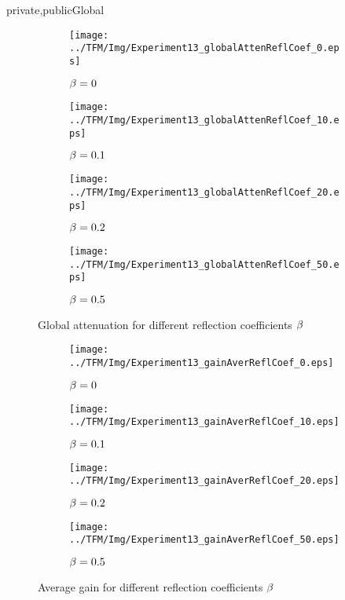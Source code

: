 \begin{shownto}{private,publicGlobal}
\begin{figure}[h]
	\centering
	\begin{subfigure}[b]{0.45\textwidth}
		\centering
		\texttt{[image: ../TFM/Img/Experiment13\_globalAttenReflCoef\_0.eps]}
		\caption{$\beta = 0$}
	\end{subfigure}
	\begin{subfigure}[b]{0.45\textwidth}
		\centering
		\texttt{[image: ../TFM/Img/Experiment13\_globalAttenReflCoef\_10.eps]}
		\caption{$\beta = 0.1$}
	\end{subfigure}
	\begin{subfigure}[b]{0.45\textwidth}
		\centering
		\texttt{[image: ../TFM/Img/Experiment13\_globalAttenReflCoef\_20.eps]}
		\caption{$\beta = 0.2$}
	\end{subfigure}
	\begin{subfigure}[b]{0.45\textwidth}
		\centering
		\texttt{[image: ../TFM/Img/Experiment13\_globalAttenReflCoef\_50.eps]}
		\caption{$\beta = 0.5$}
	\end{subfigure}
	
	\caption{Global attenuation for different reflection coefficients $\beta$}
	\label{globAttenDifReflectCoef}
\end{figure}
\end{shownto}
\begin{figure}[h]
	\centering
	\begin{subfigure}[b]{0.45\textwidth}
		\centering
		\texttt{[image: ../TFM/Img/Experiment13\_gainAverReflCoef\_0.eps]}
		\caption{$\beta = 0$}
	\end{subfigure}
	\begin{subfigure}[b]{0.45\textwidth}
		\centering
		\texttt{[image: ../TFM/Img/Experiment13\_gainAverReflCoef\_10.eps]}
		\caption{$\beta = 0.1$}
	\end{subfigure}
	\begin{subfigure}[b]{0.45\textwidth}
		\centering
		\texttt{[image: ../TFM/Img/Experiment13\_gainAverReflCoef\_20.eps]}
		\caption{$\beta = 0.2$}
	\end{subfigure}
	\begin{subfigure}[b]{0.45\textwidth}
		\centering
		\texttt{[image: ../TFM/Img/Experiment13\_gainAverReflCoef\_50.eps]}
		\caption{$\beta = 0.5$}
	\end{subfigure}
	
	\caption{Average gain for different reflection coefficients $\beta$}
	\label{gainAverDifReflectCoef}
\end{figure}

